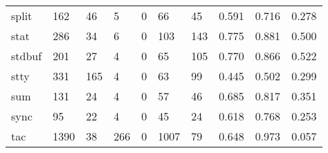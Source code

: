 \begin{longtable}{lp{1.3cm}p{1.3cm}p{1.3cm}p{1.3cm}p{1.3cm}p{1.3cm}p{1.3cm}p{1.3cm}p{1.3cm}}
split     &                    162 &                                 46 &                                 5 &                                0 &                                66 &                              45 &                                0.591 &                                  0.716 &                                0.278 \\
stat      &                    286 &                                 34 &                                 6 &                                0 &                               103 &                             143 &                                0.775 &                                  0.881 &                                0.500 \\
stdbuf    &                    201 &                                 27 &                                 4 &                                0 &                                65 &                             105 &                                0.770 &                                  0.866 &                                0.522 \\
stty      &                    331 &                                165 &                                 4 &                                0 &                                63 &                              99 &                                0.445 &                                  0.502 &                                0.299 \\
sum       &                    131 &                                 24 &                                 4 &                                0 &                                57 &                              46 &                                0.685 &                                  0.817 &                                0.351 \\
sync      &                     95 &                                 22 &                                 4 &                                0 &                                45 &                              24 &                                0.618 &                                  0.768 &                                0.253 \\
tac       &                   1390 &                                 38 &                               266 &                                0 &                              1007 &                              79 &                                0.648 &                                  0.973 &                                0.057 \\

\end{longtable}
